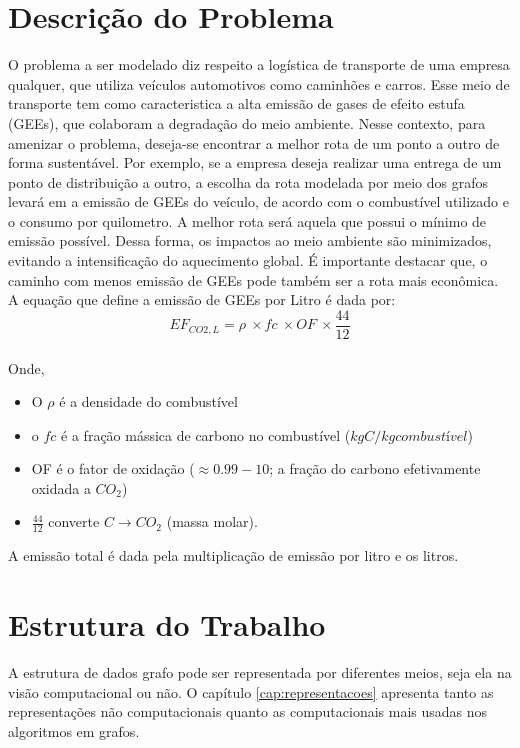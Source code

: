 \section{Descrição do Problema}\label{sec:descGrafo}
O problema a ser modelado diz respeito a logística de transporte de uma
empresa qualquer, que utiliza veículos automotivos como caminhões e carros. Esse meio de transporte tem como caracteristica a alta emissão de gases de efeito estufa (GEEs), que colaboram a degradação do meio ambiente. Nesse
contexto, para amenizar o problema, deseja-se encontrar a melhor rota de um
ponto a outro de forma sustentável. Por exemplo, se a empresa deseja realizar
uma entrega de um ponto de distribuição a outro, a escolha da rota modelada por
meio dos grafos levará em a emissão de GEEs do veículo, de acordo com o combustível utilizado e o consumo por quilometro. A melhor rota
será aquela que possui o mínimo de emissão possível. Dessa forma, os impactos ao meio ambiente são minimizados,
evitando a intensificação do aquecimento global. É importante destacar que, o caminho com menos emissão de GEEs pode também ser a rota mais econômica. A equação que define a emissão de GEEs por Litro é dada por:
\begin{equation}
	EF_{CO2,L}=\rho\ \times fc\ \times OF\ \times\frac{44}{12}
\end{equation}
\\
Onde,
\begin{itemize}
	\item O $\rho$ é  a densidade do combustível
	\item o $fc$ é a fração mássica de carbono no combustível ($kgC/kg combustível$)
	\item OF é o fator de oxidação ($\approx 0.99 - 10$; a fração do carbono efetivamente oxidada a $CO_2$)
	\item $\frac{44}{12}$  converte $C \rightarrow CO_2$ (massa molar).
\end{itemize}
A emissão total é dada pela multiplicação de emissão por litro e os litros.

\section{Estrutura do Trabalho}\label{sec:estruturaTrabalho}
A estrutura de dados grafo pode ser representada por diferentes meios, seja ela na visão computacional ou não. O capítulo \ref{cap:representacoes} apresenta tanto as representações não computacionais quanto as computacionais mais usadas nos algoritmos em grafos.

